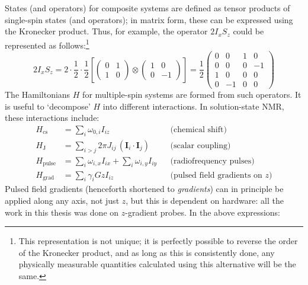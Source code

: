 States (and operators) for composite systems are defined as tensor products of single-spin states (and operators);\autocite{Sakurai2021} in matrix form, these can be expressed using the Kronecker product.\autocite{Hore2015}
Thus, for example, the operator $2I_xS_z$ could be represented as follows:\footnote{This representation is not unique; it is perfectly possible to reverse the order of the Kronecker product, and as long as this is consistently done, any physically measurable quantities calculated using this alternative will be the same.}
\begin{equation}
    \label{eq:composite_operator}
    2I_xS_z = 2 \cdot \frac{1}{2} \cdot \frac{1}{2} \left[ 
    \begin{pmatrix} 0 & 1 \\ 1 & 0 \end{pmatrix} \otimes
    \begin{pmatrix} 1 & 0 \\ 0 & -1 \end{pmatrix} \right]
    = \frac{1}{2} \begin{pmatrix} 0 & 0 & 1 & 0 \\ 0 & 0 & 0 & -1 \\ 1 & 0 & 0 & 0 \\ 0 & -1 & 0 & 0 \end{pmatrix}
\end{equation}
The Hamiltonians $H$ for multiple-spin systems are formed from such operators.
It is useful to `decompose' $H$ into different interactions.\autocite{Levitt2008}
In solution-state NMR, these interactions include:
\begin{align}
    H_\text{cs} &= \sum_i \omega_{0,i} I_{iz} & &\text{(chemical shift)} \label{eq:h_cs} \\
    H_\text{J} &= \sum_{i > j} 2\pi J_{ij} \,(\symbf{I}_{i}\cdot \symbf{I}_{j}) & &\text{(scalar coupling)} \label{eq:h_j} \\
    H_\text{pulse} &= \sum_i \omega_{i,x}I_{ix} + \sum_i \omega_{i,y}I_{iy} & &\text{(radiofrequency pulses)} \label{eq:h_pulse} \\
    H_\text{grad} &= \sum_i \gamma_i Gz I_{iz} & &\text{(pulsed field gradients on }z\text{)} \label{eq:h_grad}
\end{align}
Pulsed field gradients (henceforth shortened to \textit{gradients}) can in principle be applied along any axis, not just $z$, but this is dependent on hardware: all the work in this thesis was done on $z$-gradient probes.
In the above expressions:


